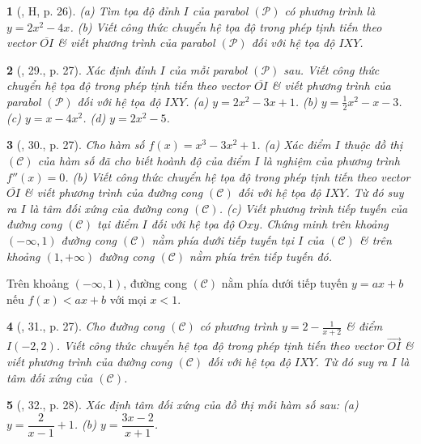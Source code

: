 \documentclass{article}
\newtheorem{baitoan}{}
\begin{document}
\begin{baitoan}[\cite{SGK_Toan_12_giai_tich_nang_cao}, H, p. 26]
	(a) Tìm tọa độ đỉnh $I$ của parabol $(\mathcal{P})$ có phương trình là $y = 2x^2 - 4x$. (b) Viết công thức chuyển hệ tọa độ trong phép tịnh tiến theo vector $\overline{OI}$ \& viết phương trình của parabol $(\mathcal{P})$ đối với hệ tọa độ $IXY$.
\end{baitoan}

\begin{baitoan}[\cite{SGK_Toan_12_giai_tich_nang_cao}, 29., p. 27]
	Xác định đỉnh $I$ của mỗi parabol $(\mathcal{P})$ sau. Viết công thức chuyển hệ tọa độ trong phép tịnh tiến theo vector $\overline{OI}$ \& viết phương trình của parabol $(\mathcal{P})$ đối với hệ tọa độ $IXY$. (a) $y = 2x^2 - 3x + 1$. (b) $y = \frac{1}{2}x^2 - x - 3$. (c) $y = x - 4x^2$. (d) $y = 2x^2 - 5$.
\end{baitoan}

\begin{baitoan}[\cite{SGK_Toan_12_giai_tich_nang_cao}, 30., p. 27]
	Cho hàm số $f(x) = x^3 - 3x^2 + 1$. (a) Xác điểm $I$ thuộc đồ thị $(\mathcal{C})$ của hàm số đã cho biết hoành độ của điểm $I$ là nghiệm của phương trình $f''(x) = 0$. (b) Viết công thức chuyển hệ tọa độ trong phép tịnh tiến theo vector $\overline{OI}$ \& viết phương trình của đường cong $(\mathcal{C})$ đối với hệ tọa độ $IXY$. Từ đó suy ra $I$ là tâm đối xứng của đường cong $(\mathcal{C})$. (c) Viết phương trình tiếp tuyến của đường cong $(\mathcal{C})$ tại điểm $I$ đối với hệ tọa độ $Oxy$. Chứng minh trên khoảng $(-\infty,1)$ đường cong $(\mathcal{C})$ nằm phía dưới tiếp tuyến tại $I$ của $(\mathcal{C})$ \& trên khoảng $(1,+\infty)$ đường cong $(\mathcal{C})$ nằm phía trên tiếp tuyến đó.
\end{baitoan}
 Trên khoảng $(-\infty,1)$, đường cong $(\mathcal{C})$ nằm phía dưới tiếp tuyến $y = ax + b$ nếu $f(x) < ax + b$ với mọi $x < 1$.

\begin{baitoan}[\cite{SGK_Toan_12_giai_tich_nang_cao}, 31., p. 27]
	Cho đường cong $(\mathcal{C})$ có phương trình $y = 2 - \frac{1}{x + 2}$ \& điểm $I(-2,2)$. Viết công thức chuyển hệ tọa độ trong phép tịnh tiến theo vector $\vec{OI}$ \& viết phương trình của đường cong $(\mathcal{C})$ đối với hệ tọa độ $IXY$. Từ đó suy ra $I$ là tâm đối xứng của $(\mathcal{C})$.
\end{baitoan}

\begin{baitoan}[\cite{SGK_Toan_12_giai_tich_nang_cao}, 32., p. 28]
	Xác định tâm đối xứng của đồ thị mỗi hàm số sau: (a) $y = \dfrac{2}{x - 1} + 1$. (b) $y = \dfrac{3x - 2}{x + 1}$.
\end{baitoan}
\end{document}

